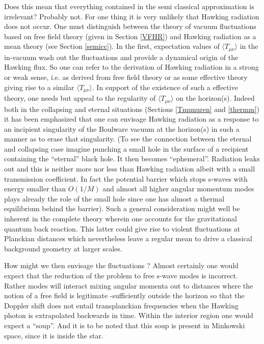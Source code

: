 \documentclass[12pt,oneside]{report}
\begin{document}
Does this mean that everything contained in the semi classical approximation
is
irrelevant\cite{Jacobson2}? Probably not. For one thing it is very
unlikely that Hawking radiation does not occur. 
One must distinguish between the theory of vacuum fluctuations based on 
free field
theory (given in Section \ref{VFHR}) and Hawking radiation as a mean 
theory (see
Section \ref{semicc}).
In the first, expectation values of $\langle T_{\mu\nu} \rangle$ in
the in-vacuum wash out the fluctuations and provide a dynamical origin 
of the Hawking flux. So one can refer to the derivation of Hawking 
radiation in a strong or weak sense, i.e. as derived from free field
theory
or as some effective theory giving rise to a similar 
$\langle T_{\mu\nu} \rangle$.
In support of the existence of such a effective theory, one needs but appeal
to the regularity of $\langle T_{\mu\nu} \rangle$ on the horizon(s).
Indeed both in the collapsing and eternal situations (Sections \ref{Tmunuren} 
and \ref{thermm})
it has been emphasized that one can envisage Hawking radiation as a
response to an incipient singularity of the Boulware vacuum at the 
horizon(s) in such a manner as to erase that singularity.
(To see the connection between the eternal and collapsing case imagine punching
a small hole in the surface of a recipient containing the ``eternal'' black
hole. It then becomes ``ephemeral''. Radiation leaks out and this is neither
more nor less than Hawking radiation albeit with a small transmission
coefficient. In fact the potential barrier which stops
s-waves with energy smaller than $O(1/M)$ and almost all higher
angular momentum modes plays already the role of the small hole since
one has almost a thermal equilibrium behind the 
barrier\cite{Candelas}).
Such a general consideration might well be inherent in the complete
theory wherein one accounts for the gravitational quantum back reaction.
This latter could give rise to violent fluctuations at Planckian
distances which nevertheless leave a regular mean to drive a classical
background geometry at larger scales.

How might we then envisage the fluctuations ?
Almost certainly one would expect that the reduction of
the problem to free s-wave modes is incorrect. Rather
modes will interact mixing angular momenta out to
distances where the notion of a free field is legitimate
-sufficiently outside the horizon so that the Doppler
shift does not entail transplanckian frequencies when the
Hawking photon is extrapolated backwards in time. Within
the interior region one would expect a ``soup''.
And it is to be noted that this soup is
present in Minkowski space, since it is inside the star.
\end{document}
